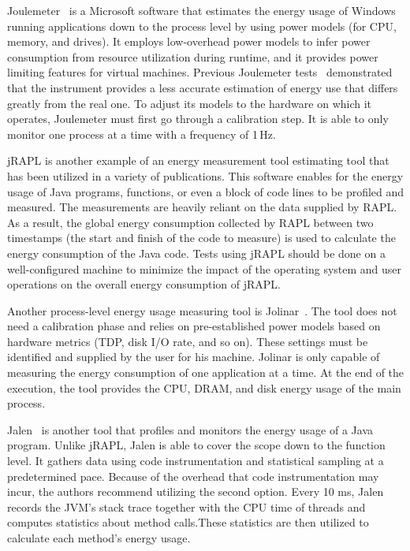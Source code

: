 Joulemeter~\cite{kothari2009joulemeter,jagroep2017energy} is a Microsoft software that estimates the energy usage of Windows running applications down to the process level by using power models (for CPU, memory, and drives).
It employs low-overhead power models to infer power consumption from resource utilization during runtime, and it provides power limiting features for virtual machines.
Previous Joulemeter tests~\cite{jagroep2015profiling} demonstrated that the instrument provides a less accurate estimation of energy use that differs greatly from the real one.
To adjust its models to the hardware on which it operates, Joulemeter must first go through a calibration step.
It is able to only monitor one process at a time with a frequency of 1\,Hz.



jRAPL is another example of an energy measurement tool estimating tool that has been utilized in a variety of publications\cite{guimaraes2016some,liu2015data}.
This software enables for the energy usage of Java programs, functions, or even a block of code lines to be profiled and measured.
The measurements are heavily reliant on the data supplied by RAPL.
As a result, the global energy consumption collected by RAPL between two timestamps (the start and finish of the code to measure) is used to calculate the energy consumption of the Java code.
Tests using jRAPL should be done on a well-configured machine to minimize the impact of the operating system and user operations on the overall energy consumption of jRAPL.

Another process-level energy usage measuring tool is Jolinar~\cite{islam2016measuring,noureddine2016jolinar}.
The tool does not need a calibration phase and relies on pre-established power models based on hardware metrics (TDP, disk I/O rate, and so on).
These settings must be identified and supplied by the user for his machine.
Jolinar is only capable of measuring the energy consumption of one application at a time.
At the end of the execution, the tool provides the CPU, DRAM, and disk energy usage of the main process.

Jalen~\cite{noureddine2015monitoring} is another tool that profiles and monitors the energy usage of a Java program.
Unlike jRAPL, Jalen is able to cover the scope down to the function level.
It gathers data using code instrumentation and statistical sampling at a predetermined pace.
Because of the overhead that code instrumentation may incur, the authors recommend utilizing the second option.
Every 10 ms, Jalen records the JVM's stack trace together with the CPU time of threads and computes statistics about method calls.These statistics are then utilized to calculate each method's energy usage.

